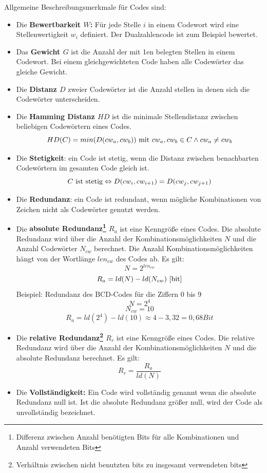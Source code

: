 \documentclass[11pt,a4paper]{scrreprt}
\begin{document}
Allgemeine Beschreibungsmerkmale für Codes sind:
\begin{itemize}
\item
	Die \textbf{Bewertbarkeit $W$:} Für jede Stelle $i$ in einem Codewort wird eine  Stellenwertigkeit $w_i$ definiert. Der Dualzahlencode ist zum Beispiel bewertet.
\item
	Das \textbf{Gewicht $G$} ist die Anzahl der mit 1en belegten Stellen in einem Codewort. Bei einem gleichgewichteten Code haben alle Codewörter das gleiche Gewicht.
\item
	Die \textbf{Distanz $D$} zweier Codewörter ist die Anzahl stellen in denen sich die Codewörter unterscheiden.
\item
	Die \textbf{Hamming Distanz $HD$} ist die minimale Stellendistanz zwischen beliebigen Codewörtern eines Codes.
	$$HD(C) = min(D(cw_a, cw_b)) \textnormal{ mit } cw_a, cw_b \in C 
		\wedge cw_a \ne cw_b $$
\item
	Die \textbf{Stetigkeit}: ein Code ist stetig, wenn die Distanz zwischen benachbarten Codewörtern im gesamten Code gleich ist.
	$$ C \textnormal{ ist stetig} \Leftrightarrow D(cw_i, cw_{i+1}) = D(cw_j, cw_{j+1}) $$
\item
	Die \textbf{Redundanz}: ein Code ist redundant, wenn mögliche Kombinationen von Zeichen nicht als Codewörter genutzt werden.
\item
	Die \textbf{absolute Redundanz\footnote{Differenz zwischen Anzahl benötigten Bits für alle Kombinationen und Anzahl verwendeten Bits} $R_a$} ist eine Kenngröße eines Codes. Die absolute Redundanz wird über die Anzahl der Kombinationsmöglichkeiten $N$ und die Anzahl Codewörter $N_{cw}$ berechnet. Die Anzahl Kombinationsmöglichkeiten hängt von der Wortlänge $len_{cw}$ des Codes ab. Es gilt:
	$$ N = 2^{len_{cw}} $$
	$$ R_a = ld(N) - ld(N_{cw}) \textnormal{ [bit]} $$
	Beispiel: Redundanz des BCD-Codes für die Ziffern 0 bis 9
	$$ N = 2^4 $$
	$$ N_{cw} = 10 $$
	$$ R_a = ld(2^4) - ld(10) \approx 4 - 3,32 = 0,68 Bit $$
\item
	Die \textbf{relative Redundanz\footnote{Verhältnis zwischen nicht benutzten bits zu insgesamt verwendeten bits} $R_r$} ist eine Kenngröße eines Codes. Die relative Redundanz wird über die Anzahl der Kombinationsmöglichkeiten $N$ und die absolute Redundanz berechnet. Es gilt:
	$$ R_r = \frac{R_a}{ld(N)} $$
\item
	Die \textbf{Vollständigkeit:} Ein Code wird vollständig genannt wenn die absolute Redundanz null ist. Ist die absolute Redundanz größer null, wird der Code als unvollständig bezeichnet.

\end{itemize}
\end{document}
